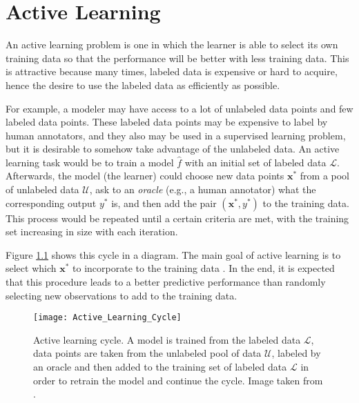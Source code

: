 
\chapter{Active Learning}
\label{ch:active_learning}



An active learning problem is one in which the learner is able to select its own training data so that the performance will be better with less training data. This is attractive because many times, labeled data is expensive or hard to acquire, hence the desire to use the labeled data as efficiently as possible.

For example, a modeler may have access to a lot of unlabeled data points and few labeled data points. These labeled data points may be expensive to label by human annotators, and they also may be used in a supervised learning problem, but it is desirable to somehow take advantage of the unlabeled data. An active learning task would be to train a model $\hat{f}$ with an initial set of labeled data $\mathcal{L}$. Afterwards, the model (the learner) could choose new data points $\boldsymbol{x}^*$ from a pool of unlabeled data $\mathcal{U}$, ask to an \textit{oracle} (e.g., a human annotator) what the corresponding output $y^*$ is, and then add the pair $(\boldsymbol{x}^*, {y}^*)$ to the training data. This process would be repeated until a certain criteria are met, with the training set increasing in size with each iteration.

Figure \ref{fig:Active_Learning_Cycle} shows this cycle in a diagram. The main goal of active learning is to select which $\boldsymbol{x}^*$ to incorporate to the training data \cite{cohn1996active}. In the end, it is expected that this procedure leads to a better predictive performance than randomly selecting new observations to add to the training data.

\begin{figure}[H]
    \centering
    \texttt{[image: Active\_Learning\_Cycle]}
    \caption{Active learning cycle. A model is trained from the labeled data $\mathcal{L}$, data points are taken from the unlabeled pool of data $\mathcal{U}$, labeled by an oracle and then added to the training set of labeled data $\mathcal{L}$ in order to retrain the model and continue the cycle. Image taken from \cite{settles.tr09}.}
    \label{fig:Active_Learning_Cycle}
\end{figure}


